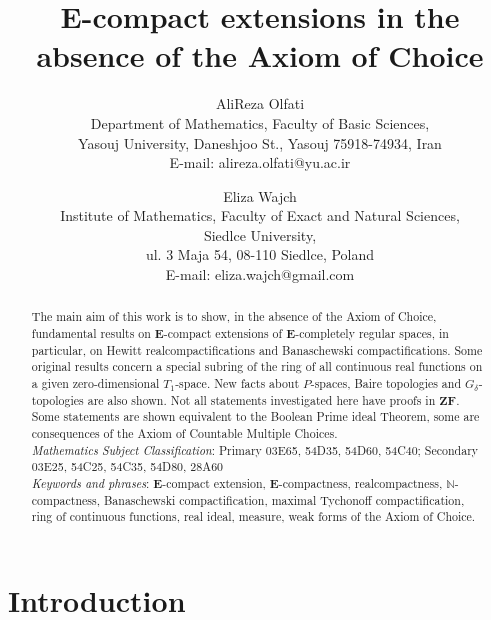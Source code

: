 \documentclass[12pt,twoside,leqno]{article}
\theoremstyle{plain}
\theoremstyle{definition}
\theoremstyle{remark}
\begin{document}
\title{$\mathbf{E}$-compact extensions in the absence of the Axiom of Choice}
\author{ AliReza Olfati \\
Department of Mathematics, Faculty of Basic Sciences,\\ 
Yasouj University, Daneshjoo St.,  Yasouj 75918-74934, Iran\\
E-mail: alireza.olfati@yu.ac.ir
\and 
Eliza Wajch\\
Institute of Mathematics,
Faculty of Exact and Natural Sciences,\\
Siedlce University,\\
ul. 3 Maja 54, 08-110 Siedlce, Poland\\
E-mail: eliza.wajch@gmail.com}
\maketitle
\begin{abstract}
The main aim of this work is to show, in the absence of the Axiom of Choice, fundamental results on $\mathbf{E}$-compact extensions of $\mathbf{E}$-completely regular spaces, in particular, on Hewitt realcompactifications and Banaschewski compactifications. Some original results concern a special subring of the ring of all continuous real functions on a given zero-dimensional $T_1$-space. New facts about $P$-spaces, Baire topologies and $G_{\delta}$-topologies are also shown. Not all statements investigated here have proofs in $\mathbf{ZF}$. Some statements are shown equivalent to the Boolean Prime ideal Theorem, some are consequences of the Axiom of Countable Multiple Choices. \\

\noindent \emph{Mathematics Subject Classification}: Primary 03E65, 54D35, 54D60, 54C40; Secondary 03E25, 54C25, 54C35, 54D80, 28A60\\
 
\noindent\emph{Keywords and phrases}: $\mathbf{E}$-compact extension, $\mathbf{E}$-compactness, realcompactness, $\mathbb{N}$-compactness, Banaschewski compactification, maximal Tychonoff compactification, ring of continuous functions, real ideal, measure, weak forms of the Axiom of Choice.
\end{abstract}

\tableofcontents




\section{Introduction}
\label{Intro}
\end{document}
